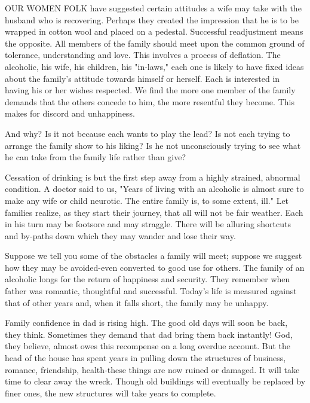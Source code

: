 
\bbChapterPreamble


\begin{biblechapter}
OUR WOMEN FOLK have suggested certain attitudes a wife may take with the husband who is recovering.  Perhaps they created the impression that he is to be wrapped in cotton wool and placed on a pedestal.  Successful readjustment means the opposite.  All members of the family should meet upon the common ground of tolerance, understanding and love.  This involves a process of deflation.  The alcoholic, his wife, his children, his "in-laws," each one is likely to have fixed ideas about the family's attitude towards himself or herself.  Each is interested in having his or her wishes respected.  We find the more one member of the family demands that the others concede to him, the more resentful they become.  This makes for discord and unhappiness.

And why?  Is it not because each wants to play the lead?  Is not each trying to arrange the family show to his liking?  Is he not unconsciously trying to see what he can take from the family life rather than give?

Cessation of drinking is but the first step away from a highly strained, abnormal condition.  A doctor said to us, "Years of living with an alcoholic is almost sure to make any wife or child neurotic.  The entire family is, to some extent, ill."  Let families realize, as they start their journey, that all will not be fair weather.  Each in his turn may be footsore and may straggle.  There will be alluring shortcuts and by-paths down which they may wander and lose their way.

Suppose we tell you some of the obstacles a family will meet; suppose we suggest how they may be avoided-even converted to good use for others.  The family of an alcoholic longs for the return of happiness and security.  They remember when father was romantic, thoughtful and successful.  Today's life is measured against that of other years and, when it falls short, the family may be unhappy.

Family confidence in dad is rising high.  The good old days will soon be back, they think.  Sometimes they demand that dad bring them back instantly!  God, they believe, almost owes this recompense on a long overdue account.  But the head of the house has spent years in pulling down the structures of business, romance, friendship, health-these things are now ruined or damaged.  It will take time to clear away the wreck.  Though old buildings will eventually be replaced by finer ones, the new structures will take years to complete.


\end{biblechapter}
